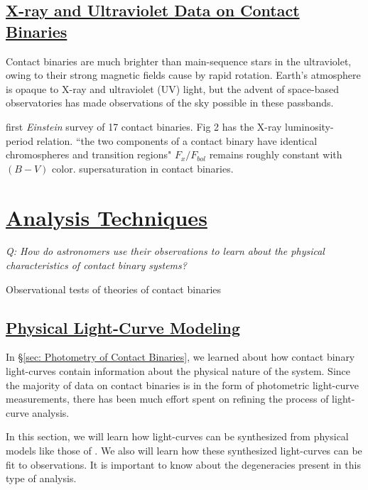 \documentclass[12pt]{article} %
\numberwithin{equation}{section} %
\begin{document}
\subsection[X-ray and Ultraviolet Data on Contact Binaries]{\hyperlink{toc}{X-ray and Ultraviolet Data on Contact Binaries}} \label{sec: X-ray and Ultraviolet Data on Contact Binaries}

Contact binaries are much brighter than main-sequence stars in the ultraviolet, owing to their strong magnetic fields cause by rapid rotation. Earth's atmosphere is opaque to X-ray and ultraviolet (UV) light, but the advent of space-based observatories has made observations of the sky possible in these passbands.

\citep{cruddace1984contact} first \emph{Einstein} survey of 17 contact binaries. Fig 2 has the X-ray luminosity- period relation.
\citep{vilhu1987chromospheric} ``the two components of a contact binary have identical chromospheres and transition regions" $F_{x} / F_{bol}$ remains roughly constant with $(B - V)$ color.
\citep{stepien2001rosat} supersaturation in contact binaries.

\section[Analysis Techniques]{\hyperlink{toc}{Analysis Techniques}} \label{sec: analysis_techniques}

\emph{Q: How do astronomers use their observations to learn about the physical characteristics of contact binary systems?}

Observational tests of theories of contact binaries \citet{lucy1979observational}

\subsection[Physical Light-Curve Modeling]{\hyperlink{toc}{Physical Light-Curve Modeling}} \label{sec: Physical Light-Curve Modeling}

In \S\ref{sec: Photometry of Contact Binaries}, we learned about how contact binary light-curves contain information about the physical nature of the system. Since the majority of data on contact binaries is in the form of photometric light-curve measurements, there has been much effort spent on refining the process of light-curve analysis.

In this section, we will learn how light-curves can be synthesized from physical models like those of \citet{lucy1968contact}. We also will learn how these synthesized light-curves can be fit to observations. It is important to know about the degeneracies present in this type of analysis. 
\end{document}
